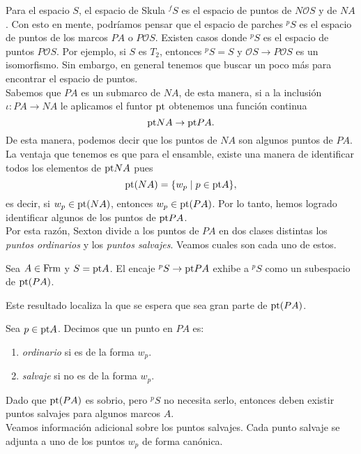 Para el espacio $S$, el espacio de Skula $^fS$ es el espacio de puntos de $N\mathcal{O}S$ y de $NA$. Con esto en mente, podríamos pensar que el espacio de parches $^pS$ es el espacio de puntos de los marcos $PA$ o $P\mathcal{O}S$. Existen casos donde $^pS$ es el espacio de puntos $P\mathcal{O}S$. Por ejemplo, si $S$ es $T_2$, entonces $^pS=S$ y $\mathcal{O}S\to P\mathcal{O}S$ es un isomorfismo. Sin embargo, en general tenemos que buscar un poco más para encontrar el espacio de puntos.\\

Sabemos que $PA$ es un submarco de $NA$, de esta manera, si a la inclusión $\iota\colon PA\to NA$ le aplicamos el funtor $\mathrm{pt}$ obtenemos una función continua
\[
\mathrm{pt} NA\to \mathrm{pt} PA.
\]
De esta manera, podemos decir que los puntos de $NA$ son algunos puntos de $PA$. La ventaja que tenemos es que para el ensamble, existe una manera de identificar todos los 
elementos de $\mathrm{pt} NA$ pues 
\[
\mathrm{pt} (NA)=\{w_p\mid p\in \mathrm{pt} A\},
\] 
es decir, si $w_p\in \mathrm{pt}(NA)$, entonces $w_p\in \mathrm{pt}(PA)$. Por lo tanto, hemos logrado identificar algunos de los puntos de $\mathrm{pt} PA$.\\

Por esta razón, Sexton divide a los puntos de $PA$ en dos clases distintas los \emph{puntos ordinarios} y los \emph{puntos salvajes}. Veamos cuales son cada uno de estos.\\  

\begin{thm}\label{Teorema9.3.3}
    Sea $A\in \mathrm{Frm}$ y $S=\mathrm{pt} A$. El encaje $^pS\to \mathrm{pt} PA$ exhibe a $^pS$ como un subespacio de $\mathrm{pt} (PA)$.
\end{thm}

Este resultado localiza la que se espera que sea gran parte de $\mathrm{pt} (PA)$.

\begin{dfn}\label{Definicion9.3.4}
    Sea $p\in \mathrm{pt} A$. Decimos que un punto en $PA$ es:
    \begin{enumerate}
        \item \emph{ordinario} si es de la forma $w_p$.
        \item \emph{salvaje} si no es de la forma $w_p$. 
    \end{enumerate}
\end{dfn}

Dado que $\mathrm{pt}(PA)$ es sobrio, pero $^pS$ no necesita serlo, entonces deben existir puntos salvajes para algunos marcos $A$.\\

Veamos información adicional sobre los puntos salvajes. Cada punto salvaje se adjunta a uno de los puntos $w_p$ de forma canónica.

